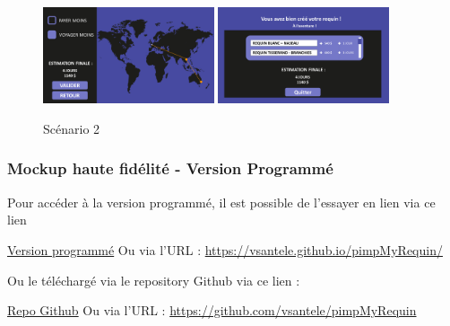 \documentclass{article}
\begin{document}
\begin{figure}[!h]
	\includegraphics[width=0.45\textwidth]{assets/prototype/haute/Diapositive23}
	\hfill
	\includegraphics[width=0.45\textwidth]{assets/prototype/haute/Diapositive24}
	\caption{Scénario 2}
	\label{scenario2}
\end{figure}

\newpage
\subsubsection{Mockup haute fidélité - Version Programmé}

Pour accéder à la version programmé, il est possible de l'essayer en lien via ce lien

\href{https://vsantele.github.io/pimpMyRequin/}{Version programmé}
Ou via l'URL : \url{https://vsantele.github.io/pimpMyRequin/}

Ou le téléchargé via le repository Github via ce lien :

\href{https://github.com/vsantele/pimpMyRequin}{Repo Github}
Ou via l'URL : \url{https://github.com/vsantele/pimpMyRequin}
\end{document}
